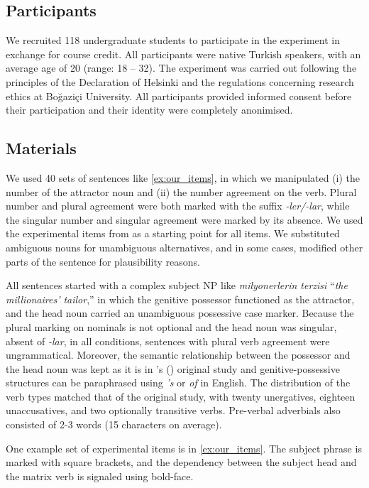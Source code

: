 \documentclass[]{interact}\usepackage[]{graphicx}\usepackage[]{color}
\theoremstyle{plain}%
\theoremstyle{definition}
\theoremstyle{remark}
\newcommand{\rev}[1]{{\color{red}#1}}
\begin{document}
\subsection{Participants} 


We recruited 118 undergraduate students to participate in the experiment in exchange for course credit. All participants were native Turkish speakers, with an average age of 20 (range: 18 -- 32). The experiment was carried out following the principles of the Declaration of Helsinki and the regulations concerning research ethics at Bo\u{g}azi\c{c}i University. All participants provided informed consent before their participation and their identity \rev{were} completely anonimised.

\subsection{Materials}

We used 40 sets of sentences like \ref{ex:our_items}, in which we manipulated (i) the number of the attractor noun and (ii) the number agreement on the verb. Plural number and plural agreement were both marked with the suffix \textit{-ler/-lar}, while the singular number and singular agreement were marked by its absence. We used the experimental items from \citet{LagoEtAl:2019} as a starting point for all items. We substituted ambiguous nouns for unambiguous alternatives, and in some cases, modified other parts of the sentence for plausibility reasons.

All sentences started with a complex subject NP like \textit{milyonerlerin terzisi} ``\textit{the millionaires' tailor},'' in which the genitive possessor functioned as the attractor, and the head noun carried an unambiguous possessive case marker. Because the plural marking on nominals is not optional and the head noun was singular, absent of \textit{-lar}, in all conditions, sentences with plural verb agreement were ungrammatical. Moreover, the semantic relationship between the possessor and the head noun was kept as it is in \citeauthor{LagoEtAl:2019}'s (\citeyear{LagoEtAl:2019}) original study and genitive-possessive structures can be paraphrased using \textit{'s} or \textit{of} in English. The distribution of the verb types matched that of the original study, with twenty unergatives, eighteen unaccusatives, and two optionally transitive verbs. Pre-verbal adverbials also consisted of 2-3 words (15 characters on average).

One example set of experimental items is in \ref{ex:our_items}. The subject phrase is marked with square brackets, and the dependency between the subject head and the matrix verb is signaled using bold-face.
\end{document}
